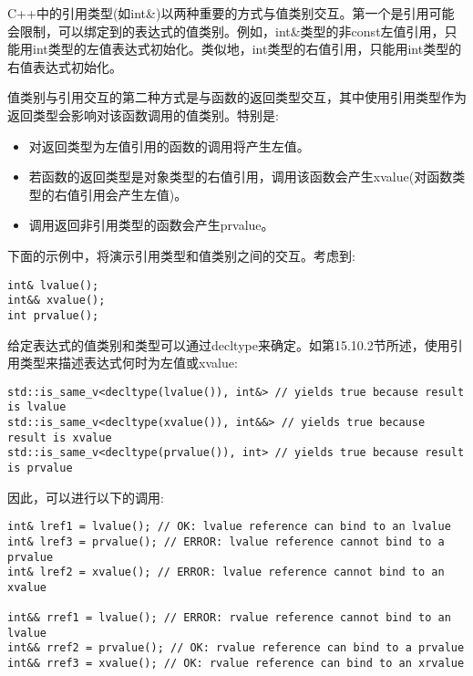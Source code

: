 C++中的引用类型(如int\&)以两种重要的方式与值类别交互。第一个是引用可能会限制，可以绑定到的表达式的值类别。例如，int\&类型的非const左值引用，只能用int类型的左值表达式初始化。类似地，int类型的右值引用，只能用int类型的右值表达式初始化。

值类别与引用交互的第二种方式是与函数的返回类型交互，其中使用引用类型作为返回类型会影响对该函数调用的值类别。特别是:

\begin{itemize}
\item 
对返回类型为左值引用的函数的调用将产生左值。

\item 
若函数的返回类型是对象类型的右值引用，调用该函数会产生xvalue(对函数类型的右值引用会产生左值)。

\item 
调用返回非引用类型的函数会产生prvalue。
\end{itemize}

下面的示例中，将演示引用类型和值类别之间的交互。考虑到:

\begin{lstlisting}[style=styleCXX]
int& lvalue();
int&& xvalue();
int prvalue();
\end{lstlisting}

给定表达式的值类别和类型可以通过decltype来确定。如第15.10.2节所述，使用引用类型来描述表达式何时为左值或xvalue:

\begin{lstlisting}[style=styleCXX]
std::is_same_v<decltype(lvalue()), int&> // yields true because result is lvalue
std::is_same_v<decltype(xvalue()), int&&> // yields true because result is xvalue
std::is_same_v<decltype(prvalue()), int> // yields true because result is prvalue
\end{lstlisting}

因此，可以进行以下的调用:

\begin{lstlisting}[style=styleCXX]
int& lref1 = lvalue(); // OK: lvalue reference can bind to an lvalue
int& lref3 = prvalue(); // ERROR: lvalue reference cannot bind to a prvalue
int& lref2 = xvalue(); // ERROR: lvalue reference cannot bind to an xvalue

int&& rref1 = lvalue(); // ERROR: rvalue reference cannot bind to an lvalue
int&& rref2 = prvalue(); // OK: rvalue reference can bind to a prvalue
int&& rref3 = xvalue(); // OK: rvalue reference can bind to an xrvalue
\end{lstlisting}
















